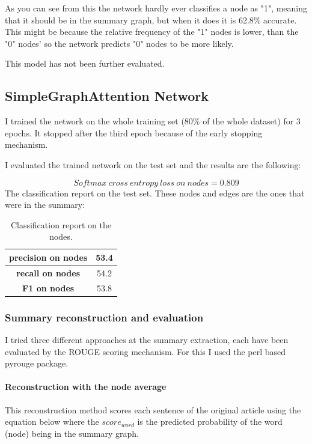 As you can see from this the network hardly ever classifies a node as "1", meaning that it should be in the summary graph, but when it does it is 62.8\% accurate. This might be because the relative frequency of the "1" nodes is lower, than the "0" nodes' so the network predicts "0" nodes to be more likely.

This model has not been further evaluated.

\FloatBarrier

\subsection{SimpleGraphAttention Network}
I trained the network on the whole training set (80\% of the whole dataset) for 3 epochs. It stopped after the third epoch because of the early stopping mechanism.

I evaluated the trained network on the test set and the results are the following:

\[Softmax\ cross\ entropy\ loss\ on\ nodes = 0.809\]
The classification report on the test set. These nodes and edges are the ones that were in the summary:
\begin{table}[!ht]
	\centering
	\begin{tabular}{| c | c |}
		\hline
		\textbf{precision on nodes}&53.4 \\ \hline
		\textbf{recall on nodes}&54.2 \\ \hline
		\textbf{F1 on nodes}&53.8 \\ \hline
	\end{tabular}
	\caption{Classification report on the nodes.}
\end{table}

\subsubsection{Summary reconstruction and evaluation}
I tried three different approaches at the summary extraction, each have been evaluated by the ROUGE scoring mechanism. For this I used the perl based pyrouge package.

\paragraph{Reconstruction with the node average}

This reconstruction method scores each sentence of the original article using the equation below where the \(score_{word}\) is the predicted probability of the word (node) being in the summary graph.

